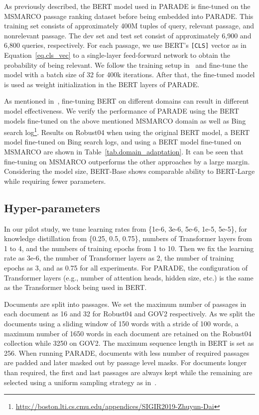 \documentclass[11pt,a4paper]{article}
\begin{document}
As previously described, the BERT model used in PARADE is fine-tuned on the MSMARCO passage ranking dataset before being embedded into PARADE.
This training set consists of approximately 400M tuples of query, relevant passage, and nonrelevant passage.
The dev set and test set consist of approximately 6,900 and 6,800 queries, respectively.
For each passage, we use BERT's \texttt{[CLS]} vector as in Equation~\ref{eq.cls_vec} to a single-layer feed-forward network to obtain the probability of being relevant.
We follow the training setup in~\cite{DBLP:journals/corr/abs-1901-04085} and fine-tune the model with a batch size of 32 for 400k iterations.
After that, the fine-tuned model is used as weight initialization in the BERT layers of PARADE.

As mentioned in~\citep{DBLP:conf/emnlp/YilmazWYZL19}, fine-tuning BERT on different domains can result in different model effectiveness.
We verify the performance of PARADE using the BERT models fine-tuned on the above mentioned MSMARCO domain as well as Bing search log\footnote{\url{http://boston.lti.cs.cmu.edu/appendices/SIGIR2019-Zhuyun-Dai}}.
Results on Robust04 when using the original BERT model, a BERT model fine-tuned on Bing search logs, and using a BERT model fine-tuned on MSMARCO are shown in Table~\ref{tab.domain_adaptation}.
It can be seen that fine-tuning on MSMARCO outperforms the other approaches by a large margin.
Considering the model size, BERT-Base shows comparable ability to BERT-Large while requiring fewer parameters.

\subsection{Hyper-parameters}
\label{sec:HPs}
In our pilot study, we tune learning rates from \{1e-6, 3e-6, 5e-6, 1e-5, 5e-5\}, 
 for knowledge distillation from \{0.25, 0.5, 0.75\},
numbers of Transformer layers from 1 to 4, and the
numbers of training epochs from 1 to 10.
Then we fix the learning rate as 3e-6, 
the number of Transformer layers as 2, 
the number of training epochs as 3,
and  as 0.75 for all experiments.
For PARADE, the configuration of Transformer layers (e.g., number of attention heads, hidden size, etc.) is the same as the Transformer block being used in BERT.

Documents are split into passages. 
We set the maximum number of passages in each document as 16 and 32 for Robust04 and GOV2 respectively.
As we split the documents using a sliding window of 150 words with a stride of 100 words, a maximum number of 1650 words in each document are retained on the Robust04 collection while 3250 on GOV2.
The maximum sequence length in BERT is set as 256.
When running PARADE, documents with less number of required passages are padded and later masked out by passage level masks.
For documents longer than required, the first and last passages are always kept while the remaining are selected using a uniform sampling strategy as in~\cite{DBLP:conf/sigir/DaiC19}. 
\end{document}

